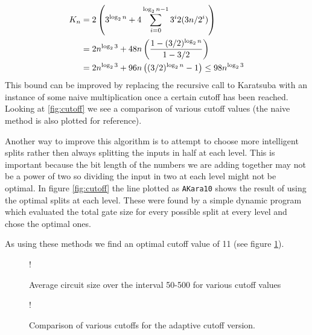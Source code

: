       \begin{align}
        K_n &= 2\left(3^{\log_2 n } + 4 \sum_{i=0}^{\log_2 n - 1} 3^i 2(3n/2^i)\right)\notag\\
            &= 2n^{\log_2 3} + 48n \left(\frac{1- (3/2)^{\log_2 n}}{1-3/2}\right) \notag\\
            &= 2n^{\log_2 3} + 96n \left((3/2)^{\log_2{n}} -1\right) \leq 98 n^{\log_2{3}}
      \end{align}
      This bound can be improved by replacing the recursive call to Karatsuba with an instance of some naive multiplication once a certain cutoff has been reached. 
      Looking at \cref{fig:cutoff} we see a comparison of various cutoff values (the naive method is also plotted for reference). 

      Another way to improve this algorithm is to attempt to choose more intelligent splits rather then always splitting the inputs in half at each level.
      This is important because the bit length of the numbers we are adding together may not be a power of two so dividing the input in two at each level might not be optimal.
      In figure \ref{fig:cutoff} the line plotted as \verb+AKara10+ shows the result of using the optimal splits at each level.
      These were found by a simple dynamic program which evaluated the total gate size for every possible split at every level and chose the optimal ones.
		
      As using these methods we find an optimal cutoff value of 11 (see figure \ref{fig:cutoffs}).
      \begin{figure}
        \capstart
        \resizebox {\textwidth} {!} {
        }
        \caption{Average circuit size over the interval 50-500 for various cutoff values}
        \label{fig:cutoffs}
      \end{figure}
      \begin{figure}
        \capstart
        \resizebox {\textwidth} {!} {
        }
        \caption{Comparison of various cutoffs for the adaptive cutoff version.}
        \label{fig:aKara}
     \end{figure}

